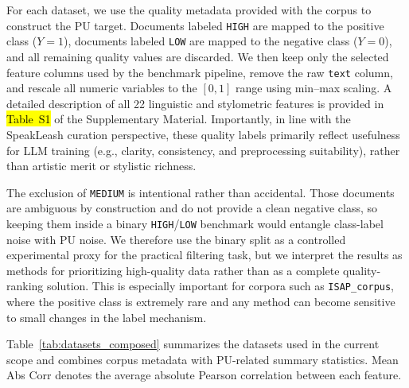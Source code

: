 \documentclass[applsci,article,accept,pdftex,moreauthors]{Definitions/mdpi}
\newcommand{\rev}[1]{{#1}}
\begin{document}
For each dataset, we use the quality metadata provided with the corpus to construct the PU target. Documents labeled \texttt{HIGH} are mapped to the positive class ($Y=1$), documents labeled \texttt{LOW} are mapped to the negative class ($Y=0$), and all remaining quality values are discarded. We then keep only the selected feature columns used by the benchmark pipeline, remove the raw \texttt{text} column, and rescale all numeric variables to the $[0,1]$ range using min--max scaling. A detailed description of all 22 linguistic and stylometric features is provided in \hl{Table~S1} %
 of the Supplementary Material. Importantly, in line with the SpeakLeash curation perspective, these quality labels primarily reflect usefulness for LLM training (e.g., clarity, consistency, and preprocessing suitability), rather than artistic merit or stylistic richness.

\rev{The exclusion of \texttt{MEDIUM} is intentional rather than accidental. Those documents are ambiguous by construction and do not provide a clean negative class, so keeping them inside a binary \texttt{HIGH}/\texttt{LOW} benchmark would entangle class-label noise with PU noise. We therefore use the binary split as a controlled experimental proxy for the practical filtering task, but we interpret the results as methods for prioritizing high-quality data rather than as a complete quality-ranking solution. This is especially important for corpora such as \texttt{ISAP\_corpus}, where the positive class is extremely rare and any method can become sensitive to small changes in the label mechanism.}

Table~\ref{tab:datasets_composed} summarizes the datasets used in the current scope and combines corpus metadata with PU-related summary statistics. Mean Abs Corr denotes the average absolute Pearson correlation between each feature.
\end{document}
